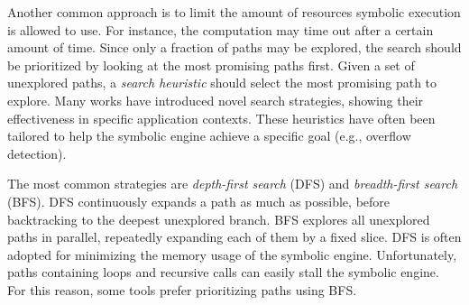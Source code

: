 
 Another common approach is to limit the amount of resources symbolic execution is allowed to use. For instance, the computation may time out after a certain amount of time. Since only a fraction of paths may be explored, the search should be prioritized by looking at the most promising paths first. Given a set of unexplored paths, a {\em search heuristic} should select the most promising path to explore. Many works have introduced novel search strategies, showing their effectiveness in specific application contexts. These heuristics have often been tailored to help the symbolic engine achieve a specific goal (e.g., overflow detection).


The most common strategies are {\em depth-first search} (DFS) and {\em breadth-first search} (BFS). DFS continuously expands a path as much as possible, before backtracking to the deepest unexplored branch. BFS explores all unexplored paths in parallel, repeatedly expanding each of them by a fixed slice. DFS is often adopted for minimizing the memory usage of the symbolic engine. Unfortunately, paths containing loops and recursive calls can easily stall the symbolic engine. For this reason, some tools prefer prioritizing paths using BFS.



